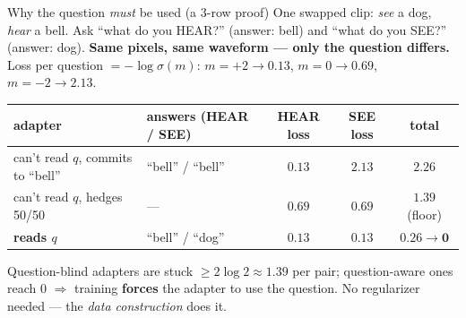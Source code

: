 \documentclass[aspectratio=169,11pt]{beamer}
\begin{document}
\begin{frame}{Why the question \emph{must} be used (a 3-row proof)}
{\small One swapped clip: \emph{see} a dog, \emph{hear} a bell. Ask ``what do you HEAR?'' (answer: bell)
and ``what do you SEE?'' (answer: dog). \textbf{Same pixels, same waveform --- only the question differs.}
Loss per question $=-\log\sigma(m)$: $m{=}{+}2\!\to\!0.13$, $m{=}0\!\to\!0.69$, $m{=}{-}2\!\to\!2.13$.}
\vspace{0.4em}
\centering
\renewcommand{\arraystretch}{1.15}
\footnotesize
\begin{tabular}{l l cc c}
\toprule
adapter & answers (HEAR / SEE) & HEAR loss & SEE loss & total \\
\midrule
can't read $q$, commits to ``bell'' & ``bell'' / ``bell'' & $0.13$ & $2.13$ & $2.26$ \\
can't read $q$, hedges 50/50        & --- & $0.69$ & $0.69$ & $\mathbf{1.39}$ (floor) \\
\textbf{reads $q$}                  & ``bell'' / ``dog''  & $0.13$ & $0.13$ & $\mathbf{0.26\to 0}$ \\
\bottomrule
\end{tabular}
\vspace{0.5em}
\par
{\small Question-blind adapters are stuck $\ge 2\log 2\approx 1.39$ per pair; question-aware ones reach
$0$ $\Rightarrow$ training \textbf{forces} the adapter to use the question. No regularizer needed ---
the \emph{data construction} does it.}
\end{frame}

\end{document}
